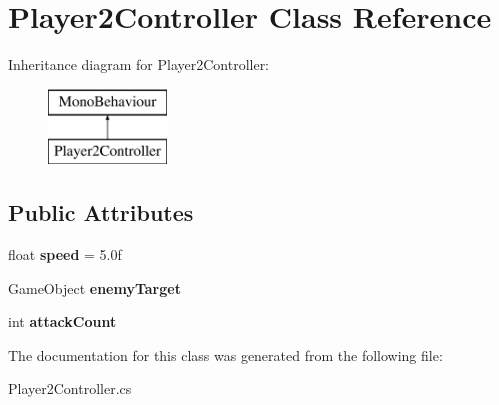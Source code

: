 \hypertarget{class_player2_controller}{}\section{Player2\+Controller Class Reference}
\label{class_player2_controller}
Inheritance diagram for Player2\+Controller\+:\begin{figure}[H]
\begin{center}
\leavevmode
\includegraphics[height=2.000000cm]{class_player2_controller}
\end{center}
\end{figure}
\subsection*{Public Attributes}
\begin{DoxyCompactItemize}
\item 
\mbox{\label{class_player2_controller_ac0e96ba11800855ced73543807248d5a}} 
float {\bfseries speed} = 5.\+0f
\item 
\mbox{\label{class_player2_controller_ad9784cd2f1a6d39831884da13208e97e}} 
Game\+Object {\bfseries enemy\+Target}
\item 
\mbox{\label{class_player2_controller_abb025e699d97733c6a12ca3680799ca8}} 
int {\bfseries attack\+Count}
\end{DoxyCompactItemize}


The documentation for this class was generated from the following file\+:\begin{DoxyCompactItemize}
\item 
Player2\+Controller.\+cs\end{DoxyCompactItemize}
